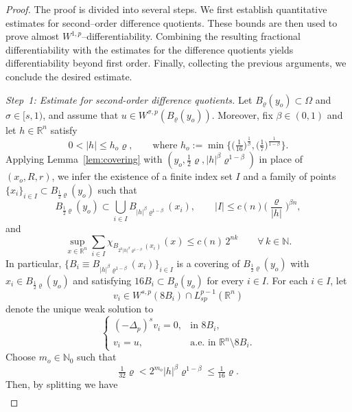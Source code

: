 \documentclass[10pt,letterpaper]{amsart}
\theoremstyle{definition}
\numberwithin{theorem}{section}
\numberwithin{equation}{section}
\newcommand{\N}{\ensuremath{\mathbb{N}}}
\newcommand{\R}{\ensuremath{\mathbb{R}}}
\newcommand{\1}{\ensuremath{\mathds{1}}}
\renewcommand{\rho}{\varrho}
\renewcommand{\rho}{\varrho}
\numberwithin{equation}{section}
\begin{document}
\begin{proof}
The proof is divided into several steps. 
We first establish quantitative estimates for second–order difference quotients.
These bounds are then used to prove almost $W^{1,p}$–differentiability.
Combining the resulting fractional differentiability with the estimates for the difference quotients yields differentiability beyond first order.
Finally, collecting the previous arguments, we conclude the desired estimate.


\smallskip
\noindent
\textit{Step~1: Estimate for second-order difference quotients.}
Let $B_\rho(y_o)\subset \Omega$ and \(\sigma \in [s,1)\), and assume that \(u \in W^{\sigma,p}(B_\rho(y_o))\).
Moreover, fix \(\beta \in (0,1)\) and let \(h \in \mathbb{R}^n\) satisfy
\[
    0<|h| \le h_o\rho, 
    \qquad\mbox{where }
    h_o
    := 
    \min\Big\{ \big(\tfrac{1}{16}\big)^{\frac{1}{\beta}},
\big(\tfrac{1}{7}\big)^{\frac{1}{1-\beta}} \Big\}.
\]
Applying Lemma~\ref{lem:covering} with
\((y_o,\tfrac12\rho,|h|^\beta\rho^{1-\beta})\) in place of \((x_o,R,r)\),
we infer the existence of a finite index set \(I\) and a family of points
\(\{x_i\}_{i\in I}\subset B_{\frac12 \rho}(y_o)\) such that
\begin{equation}\label{cov-1}
        B_{\frac12 \rho}(y_o)
    \subset
    \bigcup_{i\in I} B_{|h|^\beta\rho^{1-\beta}}(x_i),
   \qquad
    |I|
    \le
    c(n)\Big(\frac{\rho}{|h|}\Big)^{\beta n} ,
\end{equation}
and
\begin{equation}\label{cov-2}
     \sup_{x\in\mathbb{R}^n}
    \sum_{i\in I}
    \chi_{B_{2^k|h|^\beta\rho^{1-\beta}}(x_i)}(x)
    \le
    c(n)\,2^{nk}\qquad\forall\, k\in\N.
\end{equation}
In particular, \(\big\{B_i\equiv B_{|h|^\beta\rho^{1-\beta}}(x_i)\big\}_{i\in I}\) is a covering of
\(B_{\frac12 \rho}(y_o)\) with \(x_i\in B_{\frac12 \rho}(y_o)\) and satisfying
$16 B_i\subset B_\rho(y_o)$
for every $i\in I$.
For each \(i\in I\), let \[v_i\in W^{s,p}(8B_{i})\cap L_{sp}^{p-1}(\R^n)\] denote the unique weak solution to
\[
\left\{
\begin{array}{cl}
(-\Delta_p)^s v_i = 0,
& \text{in } 8 B_i, \\[6pt]
v_i = u,
& \text{a.e.\ in } \mathbb{R}^n \setminus 8 B_i.
\end{array}
\right.
\]
Choose \(m_o \in \mathbb{N}_0\) such that
\[
\tfrac{1}{32}\rho < 2^{m_o}|h|^\beta\rho^{1-\beta} \le \tfrac{1}{16}\rho.
\]
Then, by splitting we have
\begin{align}\label{Eq:tau-h-B-i}

\end{align}
\end{proof}
\end{document}
